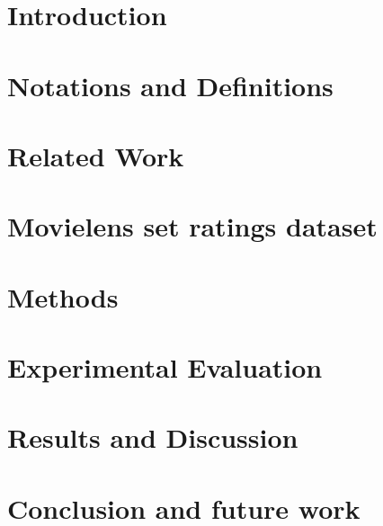 \documentclass[prodmode,acmtiis]{acmsmall}
\begin{document}


\maketitle

\section{Introduction}


\section{Notations and Definitions} \label{notation}


\section{Related Work} \label{related_work}


\section{Movielens set ratings dataset} \label{dataset}



\section{Methods} \label{lfs_method}


\section{Experimental Evaluation} \label{exp_eval}


\section{Results and Discussion} \label{results}


\section{Conclusion and future work} \label{conclusion}




\end{document}
